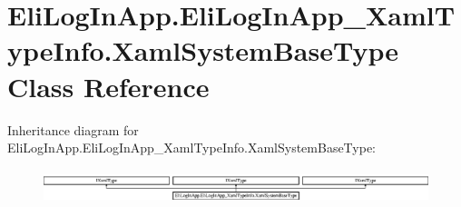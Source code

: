 \hypertarget{class_eli_log_in_app_1_1_eli_log_in_app___xaml_type_info_1_1_xaml_system_base_type}{}\section{Eli\+Log\+In\+App.\+Eli\+Log\+In\+App\+\_\+\+Xaml\+Type\+Info.\+Xaml\+System\+Base\+Type Class Reference}
\label{class_eli_log_in_app_1_1_eli_log_in_app___xaml_type_info_1_1_xaml_system_base_type}
Inheritance diagram for Eli\+Log\+In\+App.\+Eli\+Log\+In\+App\+\_\+\+Xaml\+Type\+Info.\+Xaml\+System\+Base\+Type\+:\begin{figure}[H]
\begin{center}
\leavevmode
\includegraphics[height=1.003584cm]{d9/d45/class_eli_log_in_app_1_1_eli_log_in_app___xaml_type_info_1_1_xaml_system_base_type}
\end{center}
\end{figure}
